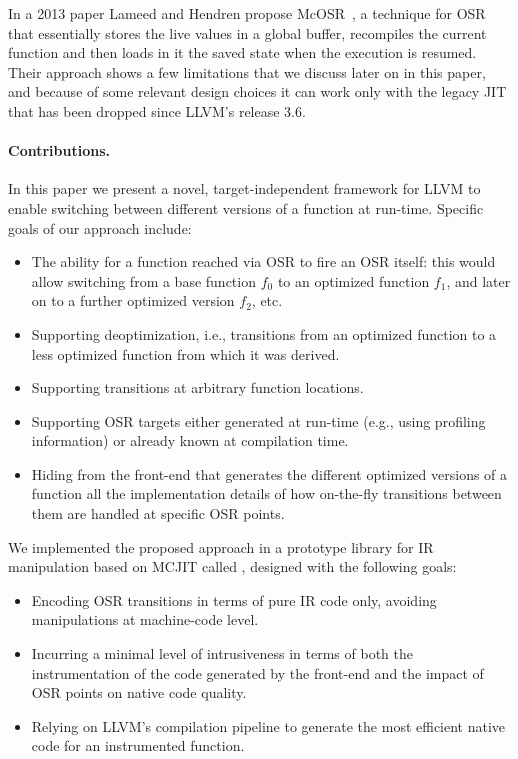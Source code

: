 In a 2013 paper Lameed and Hendren propose McOSR~\cite{lameed2013modular}, a technique for OSR that essentially stores the live values in a global buffer, recompiles the current function and then loads in it the saved state when the execution is resumed. Their approach shows a few limitations that we discuss later on in this paper, and because of some relevant design choices it can work only with the legacy JIT that has been dropped since LLVM's release 3.6.

\paragraph{Contributions.}
In this paper we present a novel, target-independent framework for LLVM to enable switching between different versions of a function at run-time. Specific goals of our approach include:
\begin{itemize}
\item The ability for a function reached via OSR to fire an OSR itself: this would allow switching from a base function $f_0$ to an optimized function $f_1$, and later on to a further optimized version $f_2$, etc.
\item Supporting deoptimization, i.e., transitions from an optimized function to a less optimized function from which it was derived.
\item Supporting transitions at arbitrary function locations.
\item Supporting OSR targets either generated at run-time (e.g., using profiling information) or already known at compilation time.
\item Hiding from the front-end that generates the different optimized versions of a function all the implementation details of how on-the-fly transitions between them are handled at specific OSR points.
\end{itemize}

\noindent We implemented the proposed approach in a prototype library for IR manipulation based on MCJIT called \osrkit, designed with the following goals:
\begin{itemize}
\item Encoding OSR transitions in terms of pure IR code only, avoiding manipulations at machine-code level.
\item Incurring a minimal level of intrusiveness in terms of both the instrumentation of the code generated by the front-end and the impact of OSR points on native code quality.
\item Relying on LLVM's compilation pipeline to generate the most efficient native code for an instrumented function.
\end{itemize}

